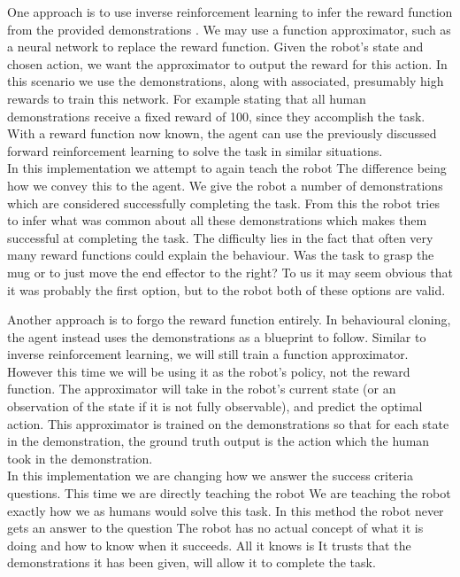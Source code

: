 One approach is to use inverse reinforcement learning to infer the reward function from the provided demonstrations \cite{inverse-rl}. We may use a function approximator, such as a neural network to replace the reward function. Given the robot's state and chosen action, we want the approximator to output the reward for this action. In this scenario we use the demonstrations, along with associated, presumably high rewards to train this network. For example stating that all human demonstrations receive a fixed reward of 100, since they accomplish the task. With a reward function now known, the agent can use the previously discussed forward reinforcement learning to solve the task in similar situations.\\
In this implementation we attempt to again teach the robot  The difference being how we convey this to the agent. We give the robot a number of demonstrations which are considered successfully completing the task. From this the robot tries to infer what was common about all these demonstrations which makes them successful at completing the task. The difficulty lies in the fact that often very many reward functions could explain the behaviour. Was the task to grasp the mug or to just move the end effector to the right? To us it may seem obvious that it was probably the first option, but to the robot both of these options are valid.

Another approach is to forgo the reward function entirely. In behavioural cloning, the agent instead uses the demonstrations as a blueprint to follow. Similar to inverse reinforcement learning, we will still train a function approximator. However this time we will be using it as the robot's policy, not the reward function. The approximator will take in the robot's current state (or an observation of the state if it is not fully observable), and predict the optimal action. This approximator is trained on the demonstrations so that for each state in the demonstration, the ground truth output is the action which the human took in the demonstration. \\
In this implementation we are changing how we answer the success criteria questions. This time we are directly teaching the robot  We are teaching the robot exactly how we as humans would solve this task. In this method the robot never gets an answer to the question  The robot has no actual concept of what it is doing and how to know when it succeeds. All it knows is  It trusts that the demonstrations it has been given, will allow it to complete the task.

